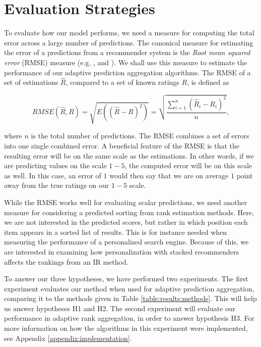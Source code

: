 \section{Evaluation Strategies}

To evaluate how our model performs, we need a measure
for computing the total error across a large number of predictions.
The canonical measure for estimating the error of a 
predictions from a recommender system
is the \emph{Root mean squared error} (RMSE) measure
(e.g. \citet[p17]{Herlocker2004}, \citet[p13]{Adomavicius2005} and \citet[p6]{Bell2007}).
We shall use this measure to estimate the performance
of our adaptive prediction aggregation algorithms.
The RMSE of a set of estimations $\hat{R}$, 
compared to a set of known ratings $R$, is defined as

\begin{equation*}
  RMSE(\hat{R},R) = \sqrt{E((\hat{R} - R)^2)}
  = \sqrt{\frac{
      \sum_{i=1}^{n} (\hat{R}_i - R_i)^2
    }{
      n
    }},
\end{equation*}

where $n$ is the total number of predictions.
The RMSE combines a set of errors into one single combined error.
A beneficial feature of the RMSE is that the resulting error 
will be on the same scale as the estimations. In other words,
if we are predicting values on the scale $1-5$, the computed error
will be on this scale as well. In this case, an error of $1$
would then say that we are on average $1$ point away from the true 
ratings on our $1-5$ scale.

While the RMSE works well for evaluating scalar predictions,
we need another measure for considering a predicted sorting 
from rank estimation methods.
Here, we are not interested in the predicted scores,
but rather in which position each item appears in a sorted list of results.
This is for instance needed when measuring the performance of a
personalized search engine.
Because of this, we are interested in examining how 
personalization with stacked recommenders affects the rankings
from an IR method.

To answer our three hypotheses, we have performed two experiments.
The first experiment evaluates our method when used for
adaptive prediction aggregation, comparing it to 
the methods given in Table \ref{table:results:methods}.
This will help us answer hypotheses H1 and H2.
The second experiment will evaluate our performance
in adaptive rank aggregation, in order to answer hypothesis H3.
For more information on how the algorithms
in this experiment were implemented, see Appendix \ref{appendix:implementation}.



